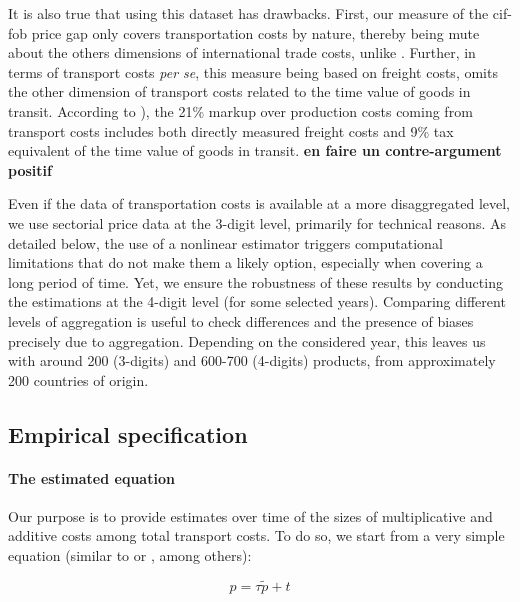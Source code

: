 \documentclass[a4paper,11pt]{article}
\begin{document}
It is also true that using this dataset has drawbacks. First, our measure of the cif-fob price gap only covers transportation costs by nature, thereby being mute about the others dimensions of international trade costs, unlike \citet{Irrazabal_2015}.  Further, in terms of transport costs \textit{per se}, this measure being based on freight costs, omits the other dimension of transport costs related to the time value of goods in transit. According to \citet{anderson_wincoop_jel}), the 21\% markup over production costs coming from transport costs includes both directly measured freight costs and 9\% tax equivalent of the time value of goods in transit. \textbf{en faire un contre-argument positif}

Even if the data of transportation costs is available at a more disaggregated level, we use sectorial price data at the 3-digit level, primarily for technical reasons. As detailed below, the use of a nonlinear estimator triggers computational limitations that do not make them a likely option, especially when covering a long period of time. Yet, we ensure the robustness of these results by conducting the estimations at the 4-digit level (for some selected years). Comparing different levels of aggregation is useful to check differences and the presence of biases precisely due to aggregation. Depending on the considered year, this leaves us with around 200 (3-digits) and 600-700 (4-digits) products, from approximately 200 countries of origin.


\subsection{Empirical specification}

\paragraph{The estimated equation} Our purpose is to provide estimates over time of the sizes of multiplicative and additive costs among total transport costs. To do so, we start from a very simple equation (similar to \cite{Irrazabal_2015} or \cite{martin2012}, among others):

\begin{equation}
p = \tau \widetilde{p} + t \label{eq:base}
\end{equation}
\end{document}
